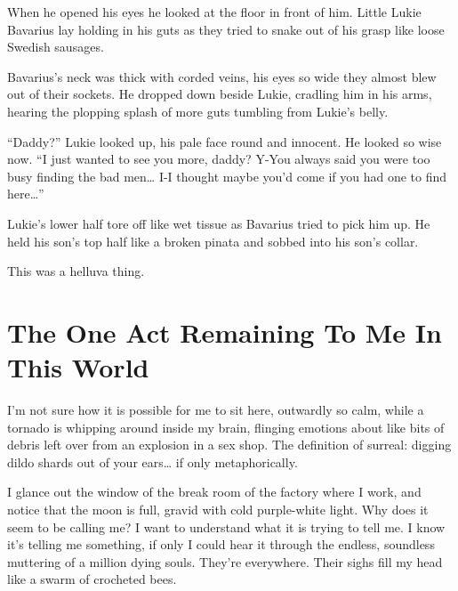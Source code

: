 When he opened his eyes he looked at the floor in front of him.
Little Lukie Bavarius lay holding in his guts as they tried to
snake out of his grasp like loose Swedish sausages.



Bavarius's neck was thick with corded veins, his eyes so wide they
almost blew out of their sockets. He dropped down beside Lukie,
cradling him in his arms, hearing the plopping splash of more guts
tumbling from Lukie's belly.



``Daddy?'' Lukie looked up, his pale face round and innocent. He
looked so wise now. ``I just wanted to see you more, daddy? Y-You
always said you were too busy finding the bad men{\ldots} I-I thought
maybe you'd come if you had one to find here{\ldots}''



Lukie's lower half tore off like wet tissue as Bavarius tried to
pick him up. He held his son's top half like a broken pinata and
sobbed into his son's collar.



This was a helluva thing. 
 



\chapter[The One Act Remaining]{The One Act Remaining To Me In This World}





I'm not sure how it is possible for me to sit here, outwardly
so calm, while a tornado is whipping around inside my brain,
flinging emotions about like bits of debris left over from an
explosion in a sex shop. The definition of surreal: digging dildo
shards out of your ears{\ldots} if only metaphorically.



I glance out the window of the break room of the factory where I
work, and notice that the moon is full, gravid with cold
purple-white light. Why does it seem to be calling me? I want to
understand what it is trying to tell me. I know it's telling
me something, if only I could hear it through the endless,
soundless muttering of a million dying souls. They're everywhere.
Their sighs fill my head like a swarm of crocheted bees.



